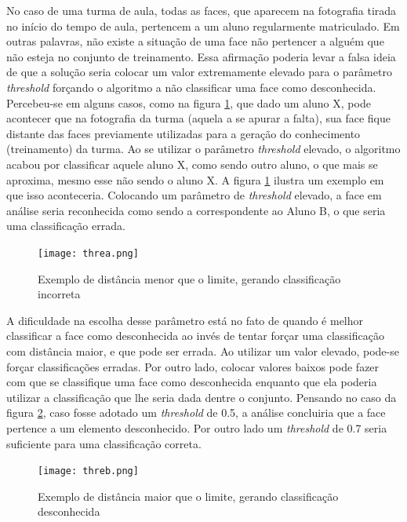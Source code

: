 No caso de uma turma de aula, todas as faces, que aparecem na fotografia tirada no início do tempo de aula, pertencem a um aluno regularmente matriculado. Em outras palavras, não existe a situação de uma face não pertencer a alguém que não esteja no conjunto de treinamento. Essa afirmação poderia levar a falsa ideia de que a solução seria colocar um valor extremamente elevado para o parâmetro \textit{threshold} forçando o algoritmo a não classificar uma face como desconhecida. Percebeu-se em alguns casos, como na figura \ref{fig:figura53}, que dado um aluno X, pode acontecer que na fotografia da turma (aquela a se apurar a falta), sua face fique distante das faces previamente utilizadas para a geração do conhecimento (treinamento) da turma. Ao se utilizar o parâmetro \textit{threshold} elevado, o algoritmo acabou por classificar aquele aluno X, como sendo outro aluno, o que mais se aproxima, mesmo esse não sendo o aluno X. A figura \ref{fig:figura53} ilustra um exemplo em que isso aconteceria. Colocando um parâmetro de \textit{threshold} elevado, a face em análise seria reconhecida como sendo a correspondente ao Aluno B, o que seria uma classificação errada. 

\begin{figure}[!ht]
	\centering
	\texttt{[image: threa.png]}   
	\caption{Exemplo de distância menor que o limite, gerando classificação incorreta }
	\label{fig:figura53}
\end{figure}


A dificuldade na escolha desse parâmetro está no fato de quando é melhor classificar a face como desconhecida ao invés de tentar forçar uma classificação com distância maior, e que pode ser errada. Ao utilizar um valor elevado, pode-se forçar classificações erradas. Por outro lado, colocar valores baixos pode fazer com que se classifique uma face como desconhecida enquanto que ela poderia utilizar a classificação que lhe seria dada dentre o conjunto. Pensando no caso da figura \ref{fig:figura54}, caso fosse adotado um \textit{threshold} de 0.5, a análise concluiria que a face pertence a um elemento desconhecido. Por outro lado um \textit{threshold} de 0.7 seria suficiente para uma classificação correta.

\begin{figure}[!ht]
	\centering
	\texttt{[image: threb.png]}   
	\caption{Exemplo de distância maior que o limite, gerando classificação desconhecida }
	\label{fig:figura54}
\end{figure}

